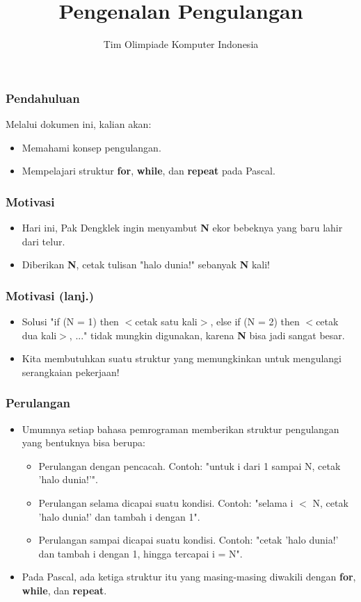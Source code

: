 \documentclass{beamer}
\title{Pengenalan Pengulangan}
\author{Tim Olimpiade Komputer Indonesia}
\begin{document}
\begin{frame}
\titlepage
\end{frame}

\begin{frame}
\frametitle{Pendahuluan}
Melalui dokumen ini, kalian akan:
\begin{itemize}
	\item Memahami konsep pengulangan.
	\item Mempelajari struktur \textbf{for}, \textbf{while}, dan \textbf{repeat} pada Pascal.
\end{itemize}
\end{frame}

\begin{frame}
\frametitle{Motivasi}
\begin{itemize}
	\item Hari ini, Pak Dengklek ingin menyambut \textbf{N} ekor bebeknya yang baru lahir dari telur.
	\item Diberikan \textbf{N}, cetak tulisan "halo dunia!" sebanyak \textbf{N} kali!
\end{itemize}
\end{frame}

\begin{frame}
\frametitle{Motivasi (lanj.)}
\begin{itemize}
	\item Solusi "if (N = 1) then $<$cetak satu kali$>$, else if (N = 2) then $<$cetak dua kali$>$, ..." tidak mungkin digunakan, karena \textbf{N} bisa jadi sangat besar.
	\item Kita membutuhkan suatu struktur yang memungkinkan untuk mengulangi serangkaian pekerjaan!
\end{itemize}
\end{frame}

\begin{frame}
\frametitle{Perulangan}
\begin{itemize}
	\item Umumnya setiap bahasa pemrograman memberikan struktur pengulangan yang bentuknya bisa berupa:
	\begin{itemize}
		\item Perulangan dengan pencacah. Contoh: "untuk i dari 1 sampai N, cetak 'halo dunia!'".
		\item Perulangan selama dicapai suatu kondisi. Contoh: "selama i $<$ N, cetak 'halo dunia!' dan tambah i dengan 1".
		\item Perulangan sampai dicapai suatu kondisi. Contoh: "cetak 'halo dunia!' dan tambah i dengan 1, hingga tercapai i = N".
	\end{itemize}
	\item Pada Pascal, ada ketiga struktur itu yang masing-masing diwakili dengan \alert{\textbf{for}}, \alert{\textbf{while}}, dan \alert{\textbf{repeat}}. 
\end{itemize}
\end{frame}
\end{document}
